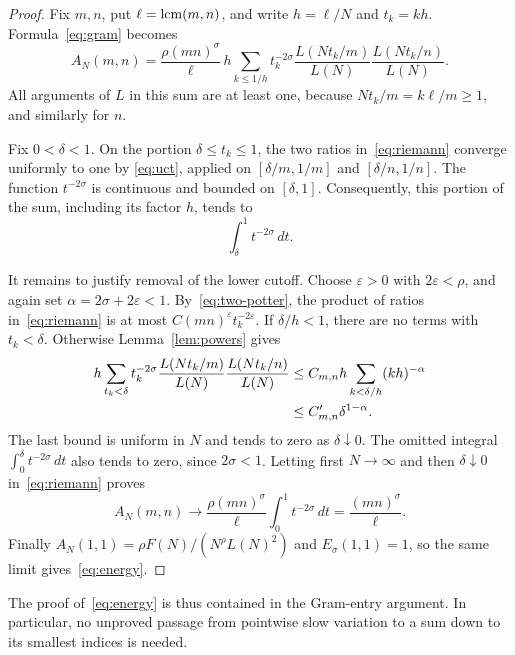 \begin{proof}
Fix $m,n$, put $\ell=\operatorname{lcm}(m,n)$, and write
$h=\ell/N$ and $t_k=kh$. Formula~\eqref{eq:gram} becomes
\begin{equation}
 A_N(m,n)=\frac{\rho(mn)^\sigma}{\ell}\,
 h\sum_{k\le1/h}t_k^{-2\sigma}
   \frac{L(Nt_k/m)}{L(N)}\frac{L(Nt_k/n)}{L(N)}.
 \label{eq:riemann}
\end{equation}
All arguments of $L$ in this sum are at least one, because
$Nt_k/m=k\ell/m\ge1$, and similarly for $n$.

Fix $0<\delta<1$. On the portion $\delta\le t_k\le1$, the
two ratios in~\eqref{eq:riemann} converge uniformly to one by
\eqref{eq:uct}, applied on $[\delta/m,1/m]$ and
$[\delta/n,1/n]$. The function $t^{-2\sigma}$ is continuous and
bounded on $[\delta,1]$. Consequently, this portion of the sum,
including its factor $h$, tends to
\begin{equation}
 \int_\delta^1 t^{-2\sigma}\,dt.
 \label{eq:truncated-integral}
\end{equation}

It remains to justify removal of the lower cutoff. Choose
$\varepsilon>0$ with $2\varepsilon<\rho$, and again set
$\alpha=2\sigma+2\varepsilon<1$. By~\eqref{eq:two-potter}, the
product of ratios in~\eqref{eq:riemann} is at most
$C(mn)^\varepsilon t_k^{-2\varepsilon}$. If $\delta/h<1$,
there are no terms with $t_k<\delta$. Otherwise
Lemma~\ref{lem:powers} gives
\begin{align}
 h\sum_{t_k<\delta}t_k^{-2\sigma}
   \frac{L(Nt_k/m)}{L(N)}\frac{L(Nt_k/n)}{L(N)}
 &\le C_{m,n}h\sum_{k<\delta/h}(kh)^{-\alpha}\notag\\
 &\le C'_{m,n}\delta^{1-\alpha}.
 \label{eq:small-tail}
\end{align}
The last bound is uniform in $N$ and tends to zero as
$\delta\downarrow0$. The omitted integral
$\int_0^\delta t^{-2\sigma}\,dt$ also tends to zero, since
$2\sigma<1$. Letting first $N\to\infty$ and then
$\delta\downarrow0$ in~\eqref{eq:riemann} proves
\[
 A_N(m,n)\longrightarrow
 \frac{\rho(mn)^\sigma}{\ell}
 \int_0^1t^{-2\sigma}\,dt
 =\frac{(mn)^\sigma}{\ell}.
\]
Finally $A_N(1,1)=\rho F(N)/(N^\rho L(N)^2)$ and
$E_\sigma(1,1)=1$, so the same limit gives~\eqref{eq:energy}.
\end{proof}

The proof of~\eqref{eq:energy} is thus contained in the Gram-entry
argument. In particular, no unproved passage from pointwise slow
variation to a sum down to its smallest indices is needed.
